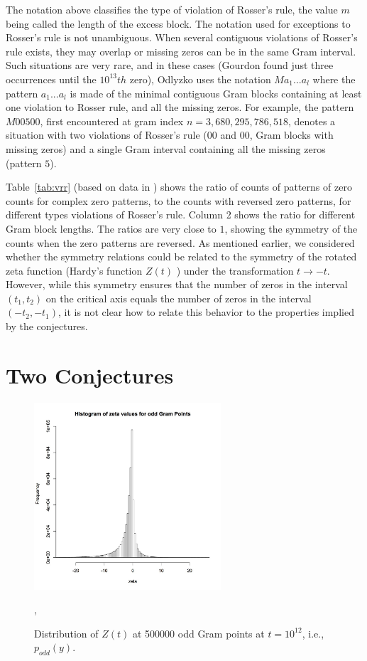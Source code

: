 \documentclass[twoside]{article}
\theoremstyle{definition}
\begin{document}
{The notation above classifies the type of violation of Rosser's rule, the value $m$ being called the length of the excess block. The notation used for exceptions to Rosser's rule is not unambiguous. When several contiguous violations of Rosser's rule exists, they may overlap or missing zeros can be in the same Gram interval. Such situations are very rare, and in these cases (Gourdon found just three occurrences until the $10^{13}th$ zero), Odlyzko uses the notation $Ma_1 ...a_l$ where the pattern $a_1 . . . a_l$ is made of the minimal contiguous Gram blocks containing at least one violation to Rosser rule, and all the missing zeros. For example, the pattern $M00500$, first encountered at gram index $n = 3,680,295,786,518$, denotes a situation with two violations of Rosser's rule ($00$ and $00$, Gram blocks with missing zeros) and a single Gram interval containing all the missing zeros (pattern $5$). 

Table~\ref{tab:vrr}  (based on data in \cite{gourdon}) shows the  ratio of counts of patterns of zero counts for complex zero patterns, to the counts with reversed zero patterns, for different types violations of Rosser's rule. Column 2 shows the ratio for different Gram block lengths. The ratios are very close to  $1$, showing the symmetry of the counts when the zero patterns are reversed.
 As mentioned earlier, we considered whether the symmetry relations could be related to the symmetry  of the rotated zeta function (Hardy's function $Z(t)$ ) under the transformation $t \rightarrow -t$. However, while this symmetry ensures that the number of zeros in the interval $(t_1, t_2)$ on the critical axis equals the number of zeros in the interval $(-t_2, -t_1)$, it is not clear how to relate this behavior  to the properties implied by the conjectures.

\section{\label{sec7}Two Conjectures}

\begin{figure}
\centering
\includegraphics[width=0.62\textwidth]{ozeta.jpg}
\caption[]{ 
  Distribution of  $Z(t)$ at 500000 odd Gram points  at $t = 10^{12}$, i.e., $p_{odd}(y)$.
 }
\vspace{1mm}, 
\label{oddhist}


\end{figure}}
\end{document}
